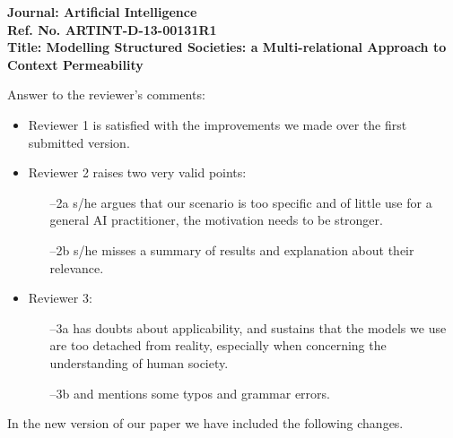\documentclass[11pt]{letter}
\begin{document}
\textbf{Journal: Artificial Intelligence\\
Ref. No. ARTINT-D-13-00131R1\\
Title: Modelling Structured Societies: a Multi-relational Approach to Context Permeability\\
}

Answer to the reviewer's comments:

\begin{itemize}
\item Reviewer 1 is satisfied with the improvements we made over the first submitted version.

\item Reviewer 2 raises two very valid points:
\begin{itemize}
\item[--2a] s/he argues that our scenario is too specific and of little use for a general AI practitioner, the motivation needs to be stronger. 
\item[--2b] s/he misses a summary of results and explanation about their relevance.
\end{itemize}

\item Reviewer 3:
\begin{itemize}
\item[--3a] has doubts about applicability, and sustains that the models we use are too detached from reality, especially when concerning the understanding of human society.
\item [--3b] and mentions some typos and grammar errors.
\end{itemize}

\end{itemize}

In the new version of our paper we have included the following changes.
\end{document}
